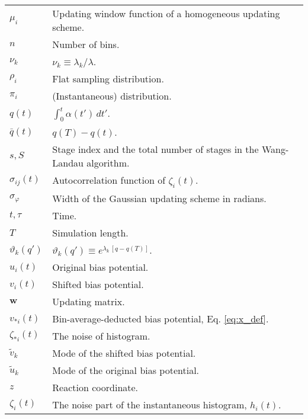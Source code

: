\documentclass[preprint, superscriptaddress, floatfix]{revtex4-1}
\begin{document}
{\begin{table*}
\begin{tabular}{l | p{12cm} }
    $\mu_i$         &   Updating window function of a homogeneous updating scheme. \\
    $n$             &   Number of bins. \\
    $\nu_k$         &   $\nu_k \equiv \lambda_k / \lambda$. \\
    $\rho_i$        &   Flat sampling distribution. \\
    $\pi_i$         &   (Instantaneous) distribution. \\
    $q(t)$          &   $\int_0^t \alpha(t') \, dt'$.  \\
    $\bar q(t)$     &   $q(T) - q(t)$.  \\
    $s, S$          &   Stage index and the total number of stages in the Wang-Landau algorithm. \\
    $\sigma_{ij}(t)$   &   Autocorrelation function of $\zeta_i(t)$. \\
    $\sigma_\varphi$   &   Width of the Gaussian updating scheme in radians. \\
    $t, \tau$       &   Time. \\
    $T$             &   Simulation length. \\
    $\vartheta_k(q')$       &   $\vartheta_k(q') \equiv e^{\lambda_k \, [q - q(T)]}$. \\
    $u_i(t)$        &   Original bias potential. \\
    $v_i(t)$        &   Shifted bias potential. \\
    $\mathbf w$     &   Updating matrix. \\
    $v_{*i}(t)$     &   Bin-average-deducted bias potential, Eq. \eqref{eq:x_def}. \\
    $\zeta_{*i}(t)$ &   The noise of histogram. \\
    ${\tilde v}_k$  &   Mode of the shifted bias potential. \\
    ${\tilde u}_k$  &   Mode of the original bias potential. \\
    $z$             &   Reaction coordinate. \\
    $\zeta_i(t)$    &   The noise part of the instantaneous histogram, $h_i(t)$.
  \end{tabular}
  \end{table*}
}


\end{document}
